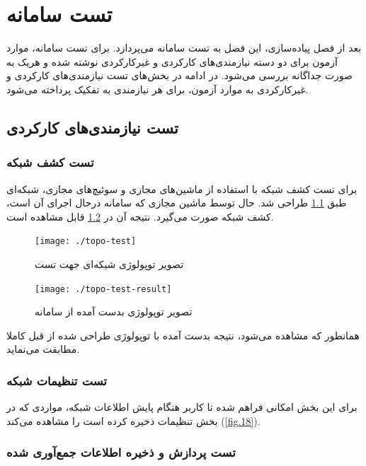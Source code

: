 \chapter{تست سامانه}

بعد از فصل پیاده‌سازی، این فصل به تست سامانه می‌پردازد. برای تست سامانه، موارد آزمون برای دو دسته نیازمندی‌های کارکردی و غیرکارکردی نوشته شده و هریک به صورت جداگانه بررسی می‌شود. در ادامه در بخش‌های تست نیازمندی‌های کارکردی و غیرکارکردی به موارد آزمون، برای هر نیازمندی به تفکیک پرداخته می‌شود.

\section{تست نیازمندی‌های کارکردی}

\subsection{تست کشف شبکه}
برای تست کشف شبکه با استفاده از ماشین‌های مجازی و سوئیچ‌های مجازی، شبکه‌ای طبق \cref{fig.51} طراحی شد. حال توسط ماشین مجازی که سامانه درحال اجرای آن است، کشف شبکه صورت می‌گیرد. نتیجه آن در \cref{fig.52} قابل مشاهده است.


\begin{figure}[!h]
    \centering\texttt{[image: ./topo-test]}
    \caption{تصویر توپولوژی شبکه‌ای جهت تست}\label{fig.51}
\end{figure}


\begin{figure}[!h]
    \centering\texttt{[image: ./topo-test-result]}
    \caption{تصویر توپولوژی بدست آمده از سامانه}\label{fig.52}
\end{figure}




\cleardoublepage

همانطور که مشاهده می‌شود، نتیجه بدست آمده با توپولوژی طراحی شده از قبل کاملا مطابقت می‌نماید.

\subsection{تست تنظیمات شبکه}

برای این بخش امکانی فراهم شده تا کاربر هنگام پایش اطلاعات شبکه، مواردی که در بخش تنظیمات ذخیره کرده است را مشاهده می‌کند (\cref{fig.18}).


\subsection{تست پردازش و ذخیره اطلاعات جمع‌آوری شده}

